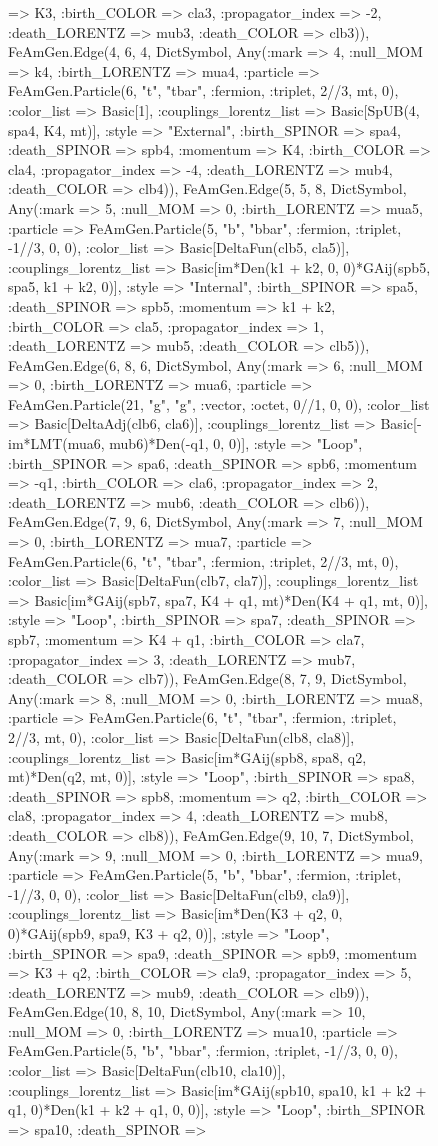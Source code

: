 \documentclass{revtex4}
\begin{document}
\begin{figure}[!htb]
\begin{center}
{=> K3, :birth_COLOR => cla3, :propagator_index => -2, :death_LORENTZ => mub3, :death_COLOR => clb3)), FeAmGen.Edge(4, 6, 4, Dict{Symbol, Any}(:mark => 4, :null_MOM => k4, :birth_LORENTZ => mua4, :particle => FeAmGen.Particle(6, "t", "tbar", :fermion, :triplet, 2//3, mt, 0), :color_list => Basic[1], :couplings_lorentz_list => Basic[SpUB(4, spa4, K4, mt)], :style => "External", :birth_SPINOR => spa4, :death_SPINOR => spb4, :momentum => K4, :birth_COLOR => cla4, :propagator_index => -4, :death_LORENTZ => mub4, :death_COLOR => clb4)), FeAmGen.Edge(5, 5, 8, Dict{Symbol, Any}(:mark => 5, :null_MOM => 0, :birth_LORENTZ => mua5, :particle => FeAmGen.Particle(5, "b", "bbar", :fermion, :triplet, -1//3, 0, 0), :color_list => Basic[DeltaFun(clb5, cla5)], :couplings_lorentz_list => Basic[im*Den(k1 + k2, 0, 0)*GAij(spb5, spa5, k1 + k2, 0)], :style => "Internal", :birth_SPINOR => spa5, :death_SPINOR => spb5, :momentum => k1 + k2, :birth_COLOR => cla5, :propagator_index => 1, :death_LORENTZ => mub5, :death_COLOR => clb5)), FeAmGen.Edge(6, 8, 6, Dict{Symbol, Any}(:mark => 6, :null_MOM => 0, :birth_LORENTZ => mua6, :particle => FeAmGen.Particle(21, "g", "g", :vector, :octet, 0//1, 0, 0), :color_list => Basic[DeltaAdj(clb6, cla6)], :couplings_lorentz_list => Basic[-im*LMT(mua6, mub6)*Den(-q1, 0, 0)], :style => "Loop", :birth_SPINOR => spa6, :death_SPINOR => spb6, :momentum => -q1, :birth_COLOR => cla6, :propagator_index => 2, :death_LORENTZ => mub6, :death_COLOR => clb6)), FeAmGen.Edge(7, 9, 6, Dict{Symbol, Any}(:mark => 7, :null_MOM => 0, :birth_LORENTZ => mua7, :particle => FeAmGen.Particle(6, "t", "tbar", :fermion, :triplet, 2//3, mt, 0), :color_list => Basic[DeltaFun(clb7, cla7)], :couplings_lorentz_list => Basic[im*GAij(spb7, spa7, K4 + q1, mt)*Den(K4 + q1, mt, 0)], :style => "Loop", :birth_SPINOR => spa7, :death_SPINOR => spb7, :momentum => K4 + q1, :birth_COLOR => cla7, :propagator_index => 3, :death_LORENTZ => mub7, :death_COLOR => clb7)), FeAmGen.Edge(8, 7, 9, Dict{Symbol, Any}(:mark => 8, :null_MOM => 0, :birth_LORENTZ => mua8, :particle => FeAmGen.Particle(6, "t", "tbar", :fermion, :triplet, 2//3, mt, 0), :color_list => Basic[DeltaFun(clb8, cla8)], :couplings_lorentz_list => Basic[im*GAij(spb8, spa8, q2, mt)*Den(q2, mt, 0)], :style => "Loop", :birth_SPINOR => spa8, :death_SPINOR => spb8, :momentum => q2, :birth_COLOR => cla8, :propagator_index => 4, :death_LORENTZ => mub8, :death_COLOR => clb8)), FeAmGen.Edge(9, 10, 7, Dict{Symbol, Any}(:mark => 9, :null_MOM => 0, :birth_LORENTZ => mua9, :particle => FeAmGen.Particle(5, "b", "bbar", :fermion, :triplet, -1//3, 0, 0), :color_list => Basic[DeltaFun(clb9, cla9)], :couplings_lorentz_list => Basic[im*Den(K3 + q2, 0, 0)*GAij(spb9, spa9, K3 + q2, 0)], :style => "Loop", :birth_SPINOR => spa9, :death_SPINOR => spb9, :momentum => K3 + q2, :birth_COLOR => cla9, :propagator_index => 5, :death_LORENTZ => mub9, :death_COLOR => clb9)), FeAmGen.Edge(10, 8, 10, Dict{Symbol, Any}(:mark => 10, :null_MOM => 0, :birth_LORENTZ => mua10, :particle => FeAmGen.Particle(5, "b", "bbar", :fermion, :triplet, -1//3, 0, 0), :color_list => Basic[DeltaFun(clb10, cla10)], :couplings_lorentz_list => Basic[im*GAij(spb10, spa10, k1 + k2 + q1, 0)*Den(k1 + k2 + q1, 0, 0)], :style => "Loop", :birth_SPINOR => spa10, :death_SPINOR => }
\end{center}
\end{figure}
\end{document}
